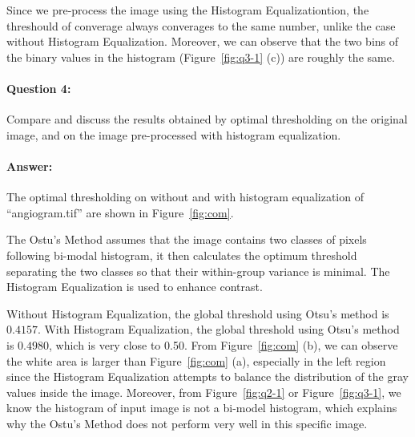 \documentclass[12pt, letter]{article}
\begin{document}
Since we pre-process the image using the Histogram Equalizationtion, the threshould of converage always converages to the same number, unlike the case without Histogram Equalization. Moreover, we can observe that the two bins of the binary values in the histogram (Figure~\ref{fig:q3-1} (c)) are roughly the same. 

\paragraph{Question 4: } Compare and discuss the results obtained by optimal thresholding on the original image, and on the image pre-processed with histogram equalization.

\paragraph{Answer: }

The optimal thresholding on without and with histogram equalization of ``angiogram.tif'' are shown in Figure~\ref{fig:com}. 

The Ostu's Method assumes that the image contains two classes of pixels following bi-modal histogram, it then calculates the optimum threshold separating the two classes so that their within-group variance is minimal. The Histogram Equalization is used to enhance contrast.

Without Histogram Equalization, the global threshold using Otsu's method is $\mathbf{0.4157}$. With Histogram Equalization, the global threshold using Otsu's method is $\mathbf{0.4980}$, which is very close to 0.50. From 
Figure~\ref{fig:com} (b), we can observe the white area is larger than Figure~\ref{fig:com} (a), especially in the left region since the Histogram Equalization attempts to balance the distribution of the gray values inside the image. Moreover, from Figure~\ref{fig:q2-1} or Figure~\ref{fig:q3-1}, we know the histogram of input image is not a bi-model histogram, which explains why the Ostu's Method does not perform very well in this specific image.
\end{document}
